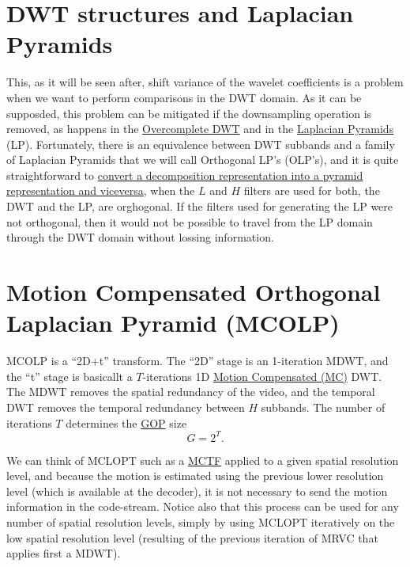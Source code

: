 
\section{DWT structures and Laplacian Pyramids}

This, as it will be seen after, shift variance of the wavelet
coefficients is a problem when we want to perform comparisons in the
DWT domain. As it can be supposded, this problem can be mitigated if
the downsampling operation is removed, as happens in the
\href{https://ieeexplore.ieee.org/document/1408191}{Overcomplete DWT}
and in the
\href{http://fourier.eng.hmc.edu/e161/lectures/canny/node3.html}{Laplacian
  Pyramids} (LP). Fortunately, there is an equivalence between DWT
subbands and a family of Laplacian Pyramids that we will call
Orthogonal LP's (OLP's), and it is quite straightforward to
\href{https://vicente-gonzalez-ruiz.github.io/pyramids-and-wavelets/}{convert
  a decomposition representation into a pyramid representation and
  viceversa}, when the $L$ and $H$ filters are used for both, the DWT
and the LP, are orghogonal. If the filters used for generating the LP
were not orthogonal, then it would not be possible to travel from the
LP domain through the DWT domain without lossing information.


\section{Motion Compensated Orthogonal Laplacian Pyramid (MCOLP)}

MCOLP is a ``2D+t'' transform. The ``2D'' stage is an 1-iteration
MDWT, and the ``t'' stage is basicallt a $T$-iterations 1D
\href{https://en.wikipedia.org/wiki/Motion_compensation}{Motion
  Compensated (MC)} DWT. The MDWT removes the spatial redundancy of
the video, and the temporal DWT removes the temporal redundancy
between $H$ subbands. The number of iterations $T$ determines the
\href{https://en.wikipedia.org/wiki/Group_of_pictures}{GOP} size
\begin{equation}
  G=2^T.
  \label{eq:GOP_size}
\end{equation}

We can think of MCLOPT such as a
\href{https://ieeexplore.ieee.org/abstract/document/1369697}{MCTF}
applied to a given spatial resolution level, and because the motion is
estimated using the previous lower resolution level (which is
available at the decoder), it is not necessary to send the motion
information in the code-stream. Notice also that this process can be
used for any number of spatial resolution levels, simply by using
MCLOPT iteratively on the low spatial resolution level (resulting of
the previous iteration of MRVC that applies first a MDWT).

